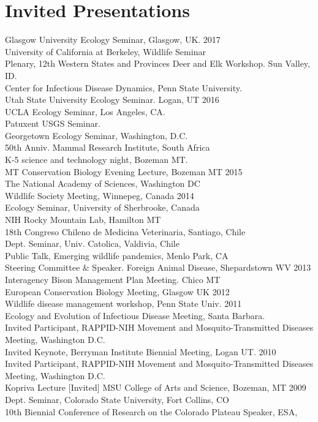 \documentclass[12pt,]{article}
\begin{document}
\hypertarget{invited-presentations}{%
\section{Invited Presentations}\label{invited-presentations}}

Glasgow University Ecology Seminar, Glasgow, UK. \hfill 2017\\
University of California at Berkeley, Wildlife Seminar\\
Plenary, 12th Western States and Provinces Deer and Elk Workshop. Sun
Valley, ID.\\
Center for Infectious Disease Dynamics, Penn State University.\\
Utah State University Ecology Seminar. Logan, UT \hfill 2016\\
UCLA Ecology Seminar, Los Angeles, CA.\\
Patuxent USGS Seminar.\\
Georgetown Ecology Seminar, Washington, D.C.\\
50th Anniv. Mammal Research Institute, South Africa\\
K-5 science and technology night, Bozeman MT.\\
MT Conservation Biology Evening Lecture, Bozeman MT \hfill 2015\\
The National Academy of Sciences, Washington DC\\
Wildlife Society Meeting, Winnepeg, Canada \hfill 2014\\
Ecology Seminar, University of Sherbrooke, Canada\\
NIH Rocky Mountain Lab, Hamilton MT\\
18th Congreso Chileno de Medicina Veterinaria, Santiago, Chile\\
Dept. Seminar, Univ. Catolica, Valdivia, Chile\\
Public Talk, Emerging wildlife pandemics, Menlo Park, CA\\
Steering Committee \& Speaker. Foreign Animal Disease, Shepardstown WV
\hfill 2013\\
Interagency Bison Management Plan Meeting. Chico MT\\
European Conservation Biology Meeting, Glasgow UK \hfill 2012\\
Wildlife disease management workshop, Penn State Univ. \hfill 2011\\
Ecology and Evolution of Infectious Disease Meeting, Santa Barbara.\\
Invited Participant, RAPPID-NIH Movement and Mosquito-Transmitted
Diseases Meeting, Washington D.C.\\
Invited Keynote, Berryman Institute Biennial Meeting, Logan UT.
\hfill 2010\\
Invited Participant, RAPPID-NIH Movement and Mosquito-Transmitted
Diseases Meeting, Washington D.C.\\
Kopriva Lecture {[}Invited{]} MSU College of Arts and Science, Bozeman,
MT \hfill 2009\\
Dept. Seminar, Colorado State University, Fort Collins, CO\\
10th Biennial Conference of Research on the Colorado Plateau Speaker,
ESA,
\end{document}
